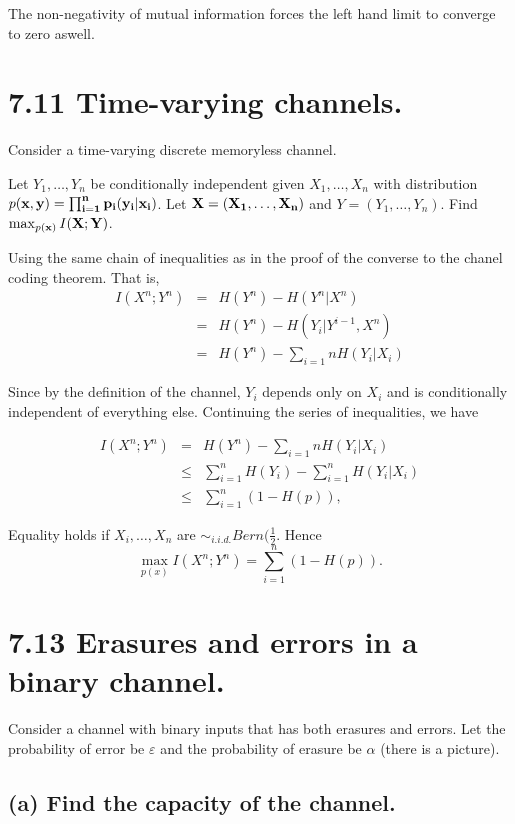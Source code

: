 \documentclass[12pt]{article}
\begin{document}
The non-negativity of mutual information forces the left hand limit to
converge to zero aswell.

\section*{7.11 Time-varying channels.}
Consider a time-varying discrete memoryless channel.

Let $Y_1,\dots,Y_n$ be conditionally independent given $X_1,\dots,X_n$ with distribution $p(\bf{x}, \bf{y}) = \prod_{i=1}^{n}p_i(y_i|x_i)$. Let $\bf{X} = (X_1,\dots,X_n)$ and $Y=(Y_1,\dots,Y_n)$. Find $\max_{p(\bf{x})} I(\bf{X};\bf{Y})$.

Using the same chain of inequalities as in the proof of the converse to the chanel coding theorem. That is,
\begin{eqnarray*}
    I(X^n;Y^n) &=& H(Y^n) - H(Y^n|X^n) \\
    &=& H(Y^n) - H(Y_i | Y^{i-1}, X^n) \\
    &=& H(Y^n) - \sum_{i=1}{n} H(Y_i | X_i)
\end{eqnarray*}

Since by the definition of the channel, $Y_i$ depends only on $X_i$ and is conditionally independent of everything else. Continuing the series of inequalities, we have

\begin{eqnarray*}
    I(X^n;Y^n) &=& H(Y^n) - \sum_{i=1}{n} H(Y_i | X_i) \\
    &\le& \sum_{i=1}^{n} H(Y_i) - \sum_{i=1}^{n}H(Y_i | X_i) \\
    &\le& \sum_{i=1}^{n} (1-H(p)),
\end{eqnarray*}

Equality holds if $X_i,\dots,X_n$ are $\sim_{i.i.d.} Bern(\frac{1}{2}$. Hence
\begin{equation*}
    \max_{p(x)} I(X^n; Y^n) = \sum_{i=1}^{n}(1-H(p)).
\end{equation*}

\section*{7.13 Erasures and errors in a binary channel.}
Consider a channel with binary inputs that has both erasures and errors. Let the probability of error be $\varepsilon$ and the probability of erasure be $\alpha$ (there is a picture).

\subsection*{(a) Find the capacity of the channel.}
\end{document}
